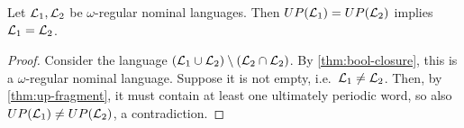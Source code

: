 \begin{theorem}
Let $\mathcal{L}_1,\mathcal{L}_2$ be $\omega$-regular nominal languages. Then $UP(\mathcal{L}_1) = UP(\mathcal{L}_2)$ implies $\mathcal{L}_1 = \mathcal{L}_2$.
\end{theorem}
\begin{proof}
Consider the language $(\mathcal{L}_1 \cup \mathcal{L}_2) \setminus (\mathcal{L}_2 \cap \mathcal{L}_2)$. By \cref{thm:bool-closure}, this is a $\omega$-regular nominal language. Suppose it is not empty, i.e.\ $\mathcal{L}_1 \neq \mathcal{L}_2$. Then, by \cref{thm:up-fragment}, it must contain at least one ultimately periodic word, so also $UP(\mathcal{L}_1) \neq UP(\mathcal{L}_2)$, a contradiction.
\end{proof}
